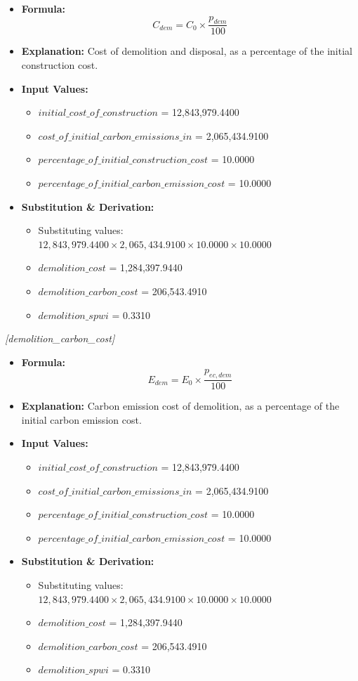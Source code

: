 \documentclass[12pt,a4paper]{article}
\begin{document}
\begin{itemize}
  \item \textbf{Formula:} $$C_{dem} = C_0 \times \frac{p_{dem}}{100}$$
  \item \textbf{Explanation:} Cost of demolition and disposal, as a percentage of the initial construction cost.
  \item \textbf{Input Values:}
  \begin{itemize}
    \item $initial\_cost\_of\_construction$ = 12,843,979.4400
    \item $cost\_of\_initial\_carbon\_emissions\_in$ = 2,065,434.9100
    \item $percentage\_of\_initial\_construction\_cost$ = 10.0000
    \item $percentage\_of\_initial\_carbon\_emission\_cost$ = 10.0000
  \end{itemize}
  \item \textbf{Substitution \& Derivation:}
  \begin{itemize}
    \item Substituting values: $12,843,979.4400 \times 2,065,434.9100 \times 10.0000 \times 10.0000$
    \item $demolition\_cost$ = 1,284,397.9440
    \item $demolition\_carbon\_cost$ = 206,543.4910
    \item $demolition\_spwi$ = 0.3310
  \end{itemize}
\end{itemize}


\textit{[demolition\_carbon\_cost]}

\begin{itemize}
  \item \textbf{Formula:} $$E_{dem} = E_0 \times \frac{p_{ec,dem}}{100}$$
  \item \textbf{Explanation:} Carbon emission cost of demolition, as a percentage of the initial carbon emission cost.
  \item \textbf{Input Values:}
  \begin{itemize}
    \item $initial\_cost\_of\_construction$ = 12,843,979.4400
    \item $cost\_of\_initial\_carbon\_emissions\_in$ = 2,065,434.9100
    \item $percentage\_of\_initial\_construction\_cost$ = 10.0000
    \item $percentage\_of\_initial\_carbon\_emission\_cost$ = 10.0000
  \end{itemize}
  \item \textbf{Substitution \& Derivation:}
  \begin{itemize}
    \item Substituting values: $12,843,979.4400 \times 2,065,434.9100 \times 10.0000 \times 10.0000$
    \item $demolition\_cost$ = 1,284,397.9440
    \item $demolition\_carbon\_cost$ = 206,543.4910
    \item $demolition\_spwi$ = 0.3310
  \end{itemize}
\end{itemize}
\end{document}
